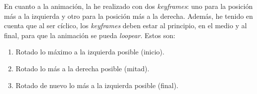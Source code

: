 \documentclass{article}
\begin{document}
En cuanto a la animación, la he realizado con dos \textit{keyframes}: uno para la posición más a la izquierda y otro para la posición más a la derecha. Además, he tenido en cuenta que al ser cíclico, los \textit{keyframes} deben estar al principio, en el medio y al final, para que la animación se pueda \textit{loopear}. Estos son:

\begin{enumerate}
    \item Rotado lo máximo a la izquierda posible (inicio).
    \item Rotado lo más a la derecha posible (mitad).
    \item Rotado de nuevo lo más a la izquierda posible (final).
\end{enumerate}

\end{document}
